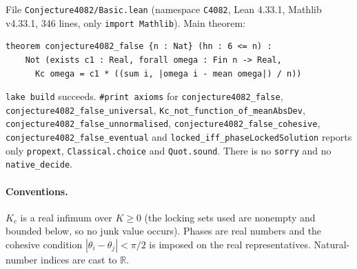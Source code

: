 \documentclass[11pt]{article}
\theoremstyle{definition}
\theoremstyle{remark}
\begin{document}
File \texttt{Conjecture4082/Basic.lean} (namespace \texttt{C4082}, Lean 4.33.1, Mathlib v4.33.1,
346 lines, only \texttt{import Mathlib}). Main theorem:
\begin{verbatim}
theorem conjecture4082_false {n : Nat} (hn : 6 <= n) :
    Not (exists c1 : Real, forall omega : Fin n -> Real,
      Kc omega = c1 * ((sum i, |omega i - mean omega|) / n))
\end{verbatim}
\texttt{lake build} succeeds. \texttt{\#print axioms} for \texttt{conjecture4082\_false},
\texttt{conjecture4082\_false\_universal}, \texttt{Kc\_not\_function\_of\_meanAbsDev},
\texttt{conjecture4082\_false\_unnormalised}, \texttt{conjecture4082\_false\_cohesive},
\texttt{conjecture4082\_false\_eventual} and \texttt{locked\_iff\_phaseLockedSolution} reports
only \texttt{propext}, \texttt{Classical.choice} and \texttt{Quot.sound}. There is no
\texttt{sorry} and no \texttt{native\_decide}.

\paragraph{Conventions.} $K_c$ is a real infimum over $K\ge0$ (the locking sets used are nonempty
and bounded below, so no junk value occurs). Phases are real numbers and the cohesive condition
$|\theta_i-\theta_j|<\pi/2$ is imposed on the real representatives. Natural-number indices are
cast to $\mathbb R$.
\end{document}
